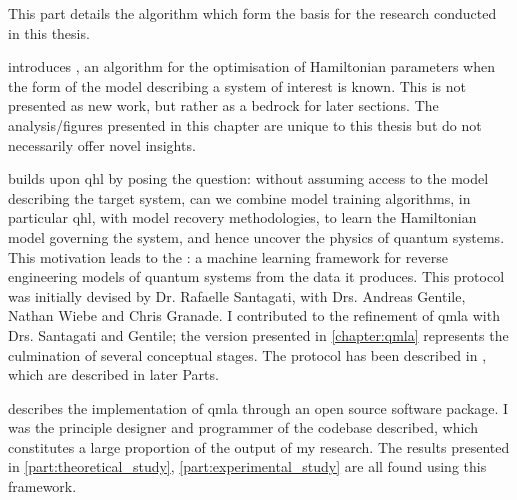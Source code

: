 This part details the algorithm which form the basis for the research conducted in this thesis. 
\par 
\vspace{1cm}
 introduces , an algorithm for the optimisation of Hamiltonian parameters
    when the form of the model describing a system of interest is known. 
    This is not presented as new work, but rather as a bedrock for later sections. 
    The analysis/figures presented in this chapter are unique to this thesis but do not necessarily offer novel insights. 
\par 
\vspace{1cm}
 builds upon \gls{qhl} by posing the question: 
    without assuming access to the model describing the target system, can we combine model training algorithms, 
    in particular \gls{qhl}, with model recovery methodologies, to learn the Hamiltonian model 
    governing the system, and hence uncover the physics of quantum systems. 
    This motivation leads to the : 
    a machine learning framework for reverse engineering models of quantum systems from the data it produces. 
    This protocol was initially devised by Dr. Rafaelle Santagati, with Drs. Andreas Gentile, Nathan Wiebe and Chris Granade. 
    I contributed to the refinement of \gls{qmla} with Drs. Santagati and Gentile; 
    the version presented in \cref{chapter:qmla} represents the culmination of several conceptual stages. 
    The protocol has been described in \cite{gentile2020learning}, which are described in later Parts. 

\par
\vspace{1cm}
 describes the implementation of \gls{qmla} through an open source software package. 
I was the principle designer and programmer of the codebase described, which constitutes a large proportion of the output of my research. 
The results presented in \cref{part:theoretical_study}, \cref{part:experimental_study} are all found using this framework. 
